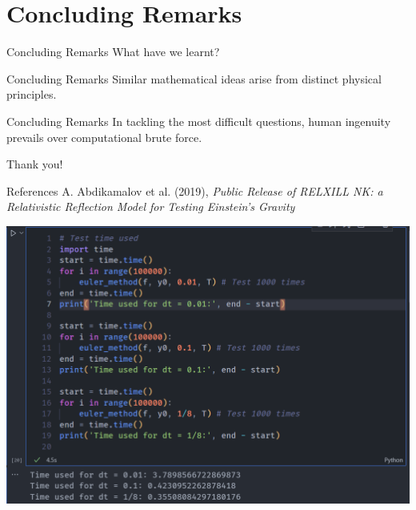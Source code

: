 \documentclass{beamer}
\begin{document}
\section{Concluding Remarks}


\begin{frame}{Concluding Remarks}
    \Large
    What have we learnt?
\end{frame}


\begin{frame}{Concluding Remarks}
    \Large
    Similar mathematical ideas arise from distinct physical principles.
\end{frame}


\begin{frame}{Concluding Remarks}
    \Large
    In tackling the most difficult questions, human ingenuity prevails over computational brute force.
\end{frame}


\begin{frame}{}
    \begin{center}
        {\Huge Thank you!}
    \end{center}
\end{frame}


\begin{frame}{References}
    A. Abdikamalov et al. (2019), \textit{Public Release of RELXILL NK: a Relativistic Reflection Model for Testing Einstein's Gravity}
\end{frame}


\begin{frame}{}
    \centering

    \includegraphics[width=\textwidth]{asset/speed_test.png}

\end{frame}
\end{document}
